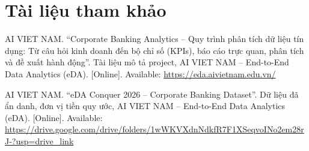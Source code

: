 \documentclass[12pt]{eDA_conquer2026}
\begin{document}
\section{Tài liệu tham khảo}

\begin{enumerate}[label={[\arabic*]}, leftmargin=0.8cm]

    \item AI VIET NAM. ``Corporate Banking Analytics -- Quy trình phân tích dữ liệu tín dụng: Từ câu hỏi kinh doanh đến bộ chỉ số (KPIs), báo cáo trực quan, phân tích và đề xuất hành động''. Tài liệu mô tả project, AI VIET NAM -- End-to-End Data Analytics (eDA). [Online]. Available: \url{https://eda.aivietnam.edu.vn/}

    \item AI VIET NAM. ``eDA Conquer 2026 -- Corporate Banking Dataset''. Dữ liệu đã ẩn danh, đơn vị tiền quy ước, AI VIET NAM -- End-to-End Data Analytics (eDA). [Online]. Available: \url{https://drive.google.com/drive/folders/1wWKVXdnNdkfR7F1XSeqvoINo2em28rJ-?usp=drive_link}

\end{enumerate}
\end{document}

